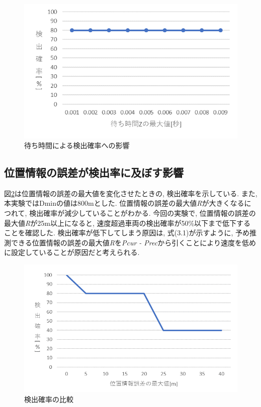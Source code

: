 \documentclass[10pt]{jreport}
\begin{document}
\begin{figure}[H]
\centering
\includegraphics[width=14cm]{figures/4_3waitdetect.png}
\caption{待ち時間による検出確率への影響}
\label{fig:waitdetect}
\end{figure}

\subsection{位置情報の誤差が検出率に及ぼす影響}
図\ref{fig:error}は位置情報の誤差の最大値を変化させたときの, 検出確率を示している. また, 本実験ではDminの値は800mとした. 位置情報の誤差の最大値{\it R}が大きくなるにつれて, 検出確率が減少していることがわかる. 今回の実験で, 位置情報の誤差の最大値{\it R}が25m以上になると, 速度超過車両の検出確率が50\%以下まで低下することを確認した. 検出確率が低下してしまう原因は, 式(3.1)が示すように, 予め推測できる位置情報の誤差の最大値{\it R}を{\it Pcur - Prec}から引くことにより速度を低めに設定していることが原因だと考えられる. 

\begin{figure}[H]
\centering
\includegraphics[width=14cm]{figures/4_3error.png}
\caption{検出確率の比較}
\label{fig:error}
\end{figure}
\end{document}
